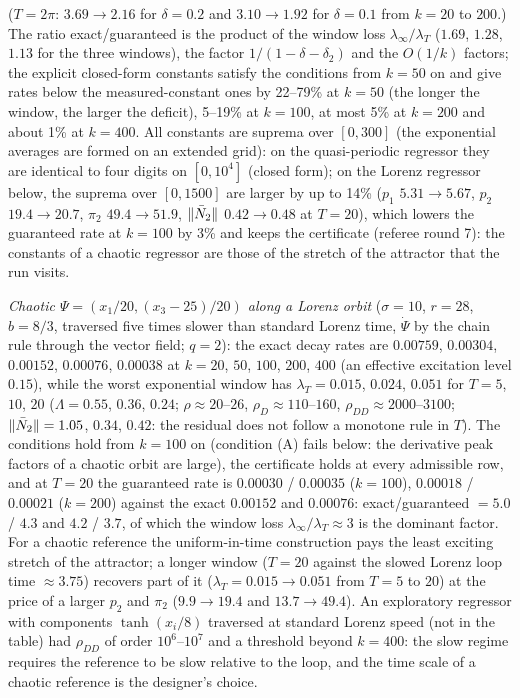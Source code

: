 \noindent($T=2\pi$: $3.69\to2.16$ for $\delta=0.2$ and $3.10\to1.92$ for $\delta=0.1$ from $k=20$ to $200$.) The
ratio exact/guaranteed is the product of the window loss $\lambda_\infty/\lambda_T$ ($1.69$, $1.28$, $1.13$ for the
three windows), the factor $1/(1-\delta-\delta_2)$ and the $O(1/k)$ factors; the explicit closed-form constants
satisfy the conditions from $k=50$ on and give rates below the measured-constant ones by 22--79\% at $k=50$ (the
longer the window, the larger the deficit), 5--19\% at $k=100$, at most 5\% at $k=200$ and about 1\% at $k=400$. All
constants are suprema over $[0,300]$ (the exponential averages are formed on an extended grid): on the quasi-periodic
regressor they are identical to four digits on $[0,10^4]$ (closed form); on the Lorenz regressor below, the suprema
over $[0,1500]$ are larger by up to 14\% ($p_1$ $5.31\to5.67$, $p_2$ $19.4\to20.7$, $\pi_2$ $49.4\to51.9$,
$\lVert \bar N_2\rVert$ $0.42\to0.48$ at $T=20$), which lowers the guaranteed rate at $k=100$ by 3\% and keeps the
certificate (referee round 7): the constants of a chaotic regressor are those of the stretch of the attractor that
the run visits.

\smallskip
\noindent\emph{Chaotic $\Psi=(x_1/20,(x_3-25)/20)$ along a Lorenz orbit} ($\sigma=10$, $r=28$, $b=8/3$, traversed
five times slower than standard Lorenz time, $\dot\Psi$ by the chain rule through the vector field; $q=2$): the exact
decay rates are $0.00759$, $0.00304$, $0.00152$, $0.00076$, $0.00038$ at $k=20$, $50$, $100$, $200$, $400$ (an
effective excitation level $0.15$), while the worst exponential window has $\lambda_T=0.015$, $0.024$, $0.051$ for
$T=5$, $10$, $20$ ($\Lambda=0.55$, $0.36$, $0.24$; $\rho\approx20$--$26$, $\rho_D\approx110$--$160$,
$\rho_{DD}\approx2000$--$3100$; $\lVert \bar N_2\rVert=1.05$, $0.34$, $0.42$: the residual does not follow a monotone rule
in $T$). The conditions hold from $k=100$ on (condition (A) fails below: the derivative peak factors of a chaotic
orbit are large), the certificate holds at every admissible row, and at $T=20$ the guaranteed rate is $0.00030$ /
$0.00035$ ($k=100$), $0.00018$ / $0.00021$ ($k=200$) against the exact $0.00152$ and $0.00076$:
exact/guaranteed $=5.0$ / $4.3$ and $4.2$ / $3.7$, of which the window loss $\lambda_\infty/\lambda_T\approx3$ is the
dominant factor. For a chaotic reference the uniform-in-time construction pays the least exciting stretch of the
attractor; a longer window ($T=20$ against the slowed Lorenz loop time $\approx3.75$) recovers part of it
($\lambda_T=0.015\to0.051$ from $T=5$ to $20$) at the price of a larger $p_2$ and $\pi_2$ ($9.9\to19.4$ and
$13.7\to49.4$). An exploratory regressor with components $\tanh(x_i/8)$ traversed at standard Lorenz speed (not in
the table) had $\rho_{DD}$ of order $10^6$--$10^7$ and a threshold beyond $k=400$: the slow regime requires the
reference to be slow relative to the loop, and the time scale of a chaotic reference is the designer's choice.

